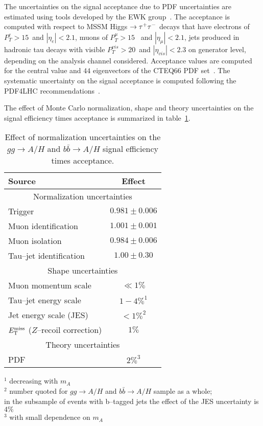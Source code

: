 The uncertainties on the signal acceptance due to PDF uncertainties are
estimated using tools developed by the EWK
group~\cite{CMS_EWK_pdfUncertaintyTools}.  The acceptance is computed with
respect to MSSM Higgs $\to \tau^+\tau^-$ decays that have electrons of $P_{T}^{e} >
15$~\GeV and $\left| \eta_{e} \right| < 2.1$, muons of $P_{T}^{\mu} > 15$~\GeV
and $\left| \eta_{\mu} \right| < 2.1$, jets produced in hadronic tau decays with
visible $P_{T}^{vis} > 20$~\GeV and $\left| \eta_{vis} \right| < 2.3$ on
generator level, depending on the analysis channel considered.  Acceptance
values are computed for the central value and $44$ eigenvectors of the CTEQ66
PDF set~\cite{CTEQpdfSet}.  The systematic uncertainty on the signal acceptance
is computed following the PDF4LHC
recommendations~\cite{pdfAccSys01,pdfAccSys02}.


The effect of Monte Carlo normalization, shape and theory uncertainties on the
signal efficiency times acceptance is summarized in
table~\ref{tab:ExpUncertainties}.

\begin{table}[t]
\begin{center}
\tablesize
\begin{tabular}{|l|c|}
\hline
Source & Effect \\
\hline
\hline
\multicolumn{2}{|c|}{Normalization uncertainties} \\
\hline
Trigger                         & $0.981 \pm 0.006$ \\
Muon identification             & $1.001 \pm 0.001$ \\
Muon isolation                  & $0.984 \pm 0.006$ \\
Tau--jet identification         & $1.00  \pm 0.30$ \\
\hline
\hline
\multicolumn{2}{|c|}{Shape uncertainties} \\
\hline
Muon momentum scale             & $\ll 1\%$ \\
Tau--jet energy scale           & $1 - 4\%^{1}$ \\
Jet energy scale (JES)          & $< 1\%^{2}$ \\
$E_{\mathrm{T}}^{\text{miss}}$ ($Z$--recoil correction) & $1\%$ \\
\hline
\hline
\multicolumn{2}{|c|}{Theory uncertainties} \\
\hline
PDF & $2\%^{3}$ \\
\hline
\end{tabular}
\end{center}
$^{1}$ decreasing with $m_{A}$ \\
$^{2}$ number quoted for $gg \to A/H$ and $b\bar{b} \to A/H$ sample as a whole; \\
\hspace{5mm} in the subsample of events with b--tagged jets the effect of the JES uncertainty is $4\%$ \\
$^{3}$ with small dependence on $m_{A}$ \\
\begin{center}
\caption{\captiontext
         Effect of normalization uncertainties on the $gg \to A/H$ and $b\bar{b} \to A/H$ signal efficiency times acceptance.}
\label{tab:ExpUncertainties}
\end{center}
\end{table}


\ifx\master\undefined\fi
